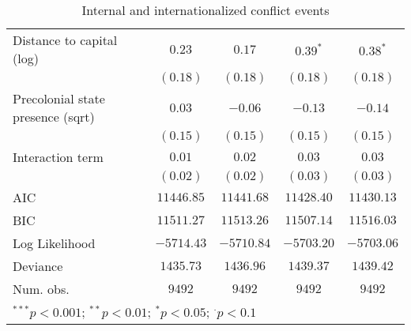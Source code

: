 \begin{sidewaystable}
\begin{center}
{\begin{tabular}{l c c c c}
Distance to capital (log)                & $0.23$         & $0.17$         & $0.39^{*}$    & $0.38^{*}$    \\
                                         & $(0.18)$       & $(0.18)$       & $(0.18)$      & $(0.18)$      \\
Precolonial state presence (sqrt)        & $0.03$         & $-0.06$        & $-0.13$       & $-0.14$       \\
                                         & $(0.15)$       & $(0.15)$       & $(0.15)$      & $(0.15)$      \\
Interaction term                         & $0.01$         & $0.02$         & $0.03$        & $0.03$        \\
                                         & $(0.02)$       & $(0.02)$       & $(0.03)$      & $(0.03)$      \\
\midrule
AIC                                      & $11446.85$     & $11441.68$     & $11428.40$    & $11430.13$    \\
BIC                                      & $11511.27$     & $11513.26$     & $11507.14$    & $11516.03$    \\
Log Likelihood                           & $-5714.43$     & $-5710.84$     & $-5703.20$    & $-5703.06$    \\
Deviance                                 & $1435.73$      & $1436.96$      & $1439.37$     & $1439.42$     \\
Num. obs.                                & $9492$         & $9492$         & $9492$        & $9492$        \\
\bottomrule
\multicolumn{5}{l}{\scriptsize{$^{***}p<0.001$; $^{**}p<0.01$; $^{*}p<0.05$; $^{\cdot}p<0.1$}}
\end{tabular}
}
\caption{Internal and internationalized conflict events}
\label{interaction_both}
\end{center}
\end{sidewaystable}
